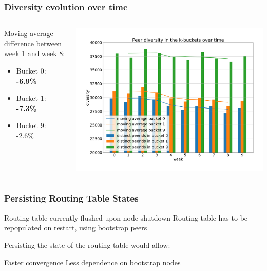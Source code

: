 \documentclass{pl-slide}
\begin{document}
\begin{frame}
\frametitle{Diversity evolution over time}

\begin{columns}[onlytextwidth]
\begin{column}{0.38\textwidth}
   Moving average difference between week 1 and week 8:
   \begin{itemize}
   		\item[] Bucket 0: \hspace{1em}\textbf{-6.9\%}
   		\item[] Bucket 1: \hspace{1em}\textbf{-7.3\%}
   		\item[] Bucket 9: \hspace{1em}-2.6\%
   \end{itemize}
\end{column}
\begin{column}{0.58\textwidth}
    \begin{center}
		\includegraphics[width=\textwidth]{plots/diversity-b0-b1-b9.png}
    \end{center}
\end{column}
\end{columns}
\end{frame}

\begin{frame}
\frametitle{Persisting Routing Table States}

\begin{itemize}
	\itemc Routing table currently flushed upon node shutdown
	\itemc Routing table has to be repopulated on restart, using bootstrap peers
\end{itemize}
\vspace{2em}
Persisting the state of the routing table would allow:
\smallskip
\begin{itemize}
	\itemc Faster convergence
	\itemc Less dependence on bootstrap nodes
\end{itemize}
\end{frame}
\end{document}
